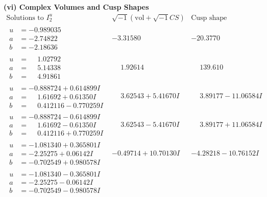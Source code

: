 \documentclass[1p]{elsarticle_modified}
\theoremstyle{definition}
\newcommand{\I}{\sqrt{-1}}
\begin{document}
\newpage\flushleft \textbf{(vi) Complex Volumes and Cusp Shapes}
$$\begin{array}{c|c|c}  
\text{Solutions to }I^u_{2}& \I (\text{vol} + \sqrt{-1}CS) & \text{Cusp shape}\\
 \hline 
\begin{aligned}
u &= -0.989035\phantom{ +0.000000I} \\
a &= -2.74822\phantom{ +0.000000I} \\
b &= -2.18636\phantom{ +0.000000I}\end{aligned}
 & -3.31580\phantom{ +0.000000I} & -20.3770\phantom{ +0.000000I} \\ \hline\begin{aligned}
u &= \phantom{-}1.02792\phantom{ +0.000000I} \\
a &= \phantom{-}5.14338\phantom{ +0.000000I} \\
b &= \phantom{-}4.91861\phantom{ +0.000000I}\end{aligned}
 & \phantom{-}1.92614\phantom{ +0.000000I} & \phantom{-}139.610\phantom{ +0.000000I} \\ \hline\begin{aligned}
u &= -0.888724 + 0.614899 I \\
a &= \phantom{-}1.61692 + 0.61350 I \\
b &= \phantom{-}0.412116 - 0.770259 I\end{aligned}
 & \phantom{-}3.62543 + 5.41670 I & \phantom{-}3.89177 - 11.06584 I \\ \hline\begin{aligned}
u &= -0.888724 - 0.614899 I \\
a &= \phantom{-}1.61692 - 0.61350 I \\
b &= \phantom{-}0.412116 + 0.770259 I\end{aligned}
 & \phantom{-}3.62543 - 5.41670 I & \phantom{-}3.89177 + 11.06584 I \\ \hline\begin{aligned}
u &= -1.081340 + 0.365801 I \\
a &= -2.25275 + 0.06142 I \\
b &= -0.702549 + 0.980578 I\end{aligned}
 & -0.49714 + 10.70130 I & -4.28218 - 10.76152 I \\ \hline\begin{aligned}
u &= -1.081340 - 0.365801 I \\
a &= -2.25275 - 0.06142 I \\
b &= -0.702549 - 0.980578 I\end{aligned}

\end{array}$$
\end{document}
